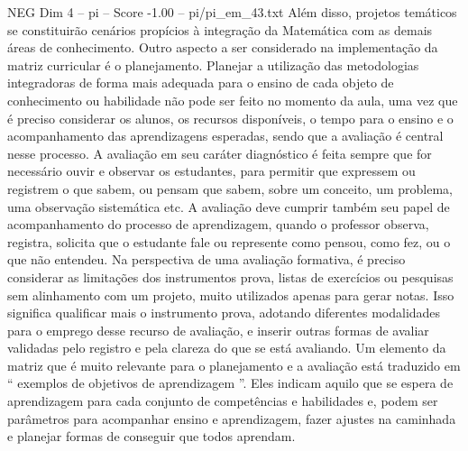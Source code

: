 \begin{textsample}{NEG Dim 4 – pi – Score -1.00 – pi/pi\_em\_43.txt}
Além disso, projetos temáticos se constituirão cenários propícios à integração da Matemática com as demais áreas de conhecimento.
Outro aspecto a ser considerado na implementação da matriz curricular é o planejamento.
Planejar a utilização das metodologias integradoras de forma mais adequada para o ensino de cada objeto de conhecimento ou habilidade não pode ser feito no momento da aula, uma vez que é preciso considerar os alunos, os recursos disponíveis, o tempo para o ensino e o acompanhamento das aprendizagens esperadas, sendo que a avaliação é central nesse processo.
A avaliação em seu caráter diagnóstico é feita sempre que for necessário ouvir e observar os estudantes, para permitir que expressem ou registrem o que sabem, ou pensam que sabem, sobre um conceito, um problema, uma observação sistemática etc.
A avaliação deve cumprir também seu papel de acompanhamento do processo de aprendizagem, quando o professor observa, registra, solicita que o estudante fale ou represente como pensou, como fez, ou o que não entendeu.
Na perspectiva de uma avaliação formativa, é preciso considerar as limitações dos instrumentos prova, listas de exercícios ou pesquisas sem alinhamento com um projeto, muito utilizados apenas para gerar notas.
Isso significa qualificar mais o instrumento prova, adotando diferentes modalidades para o emprego desse recurso de avaliação, e inserir outras formas de avaliar validadas pelo registro e pela clareza do que se está avaliando.
Um elemento da matriz que é muito relevante para o planejamento e a avaliação está traduzido em “ exemplos de objetivos de aprendizagem ”.
Eles indicam aquilo que se espera de aprendizagem para cada conjunto de competências e habilidades e, podem ser parâmetros para acompanhar ensino e aprendizagem, fazer ajustes na caminhada e planejar formas de conseguir que todos aprendam.

\end{textsample}
